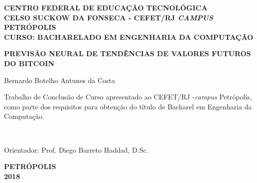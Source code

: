\begin{center}
{\large \bf CENTRO FEDERAL DE EDUCAÇÃO TECNOLÓGICA} \vspace{1mm} \\
{\large \bf CELSO SUCKOW DA FONSECA - CEFET/RJ \textit{CAMPUS} PETRÓPOLIS} \vspace{1mm} \\
{\large \bf CURSO: BACHARELADO EM ENGENHARIA DA COMPUTAÇÃO}

\vspace*{3cm}
\normalsize{\large \bf PREVISÃO NEURAL DE TENDÊNCIAS DE VALORES FUTUROS DO BITCOIN}\\
\end{center}
\vspace{1.5cm}
\hfill
	\begin{flushright}
	Bernardo Botelho Antunes da Costa
	\end{flushright}
\vspace*{1.5cm}
\begin{flushright}
	\begin{minipage}{0.5\textwidth}
		{\normalsize
		Trabalho de Conclusão de Curso apresentado ao  
	 CEFET/RJ -{\it campus} Petrópolis, como parte dos requisitos para obtenção do título de Bacharel em Engenharia da Computação.}
	\end{minipage}\\[1.5cm]
\end{flushright}
\vspace{1.5cm}
\hfill
\begin{flushright}
Orientador: Prof. Diego Barreto Haddad, D.Sc.
\end{flushright}




\vspace*{3.3cm}
\begin{center}
{\bf PETRÓPOLIS \\ 2018}\\
\end{center}



